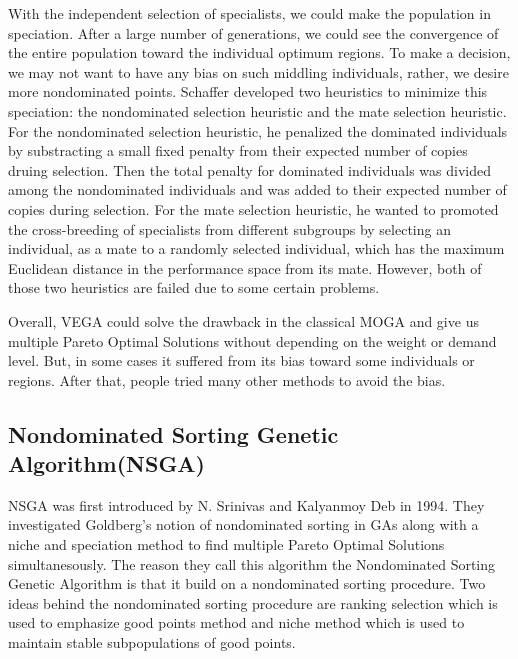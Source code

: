 With the independent selection of specialists, we could make the population in speciation. After a large number of generations, we could see the convergence of the entire population toward the individual optimum regions. To make a decision, we may not want to have any bias on such middling individuals, rather, we desire more nondominated points. Schaffer developed two heuristics to minimize this speciation: the nondominated selection heuristic and the mate selection heuristic. For the nondominated selection heuristic, he penalized the dominated individuals by substracting a small fixed penalty from their expected number of copies druing selection. Then the total penalty for dominated individuals was divided among the nondominated individuals and was added to their expected number of copies during selection. For the mate selection heuristic, he wanted to promoted the cross-breeding of specialists from different subgroups by selecting an individual, as a mate to a randomly selected individual, which has the maximum Euclidean distance in the performance space from its mate. However, both of those two heuristics are failed due to some certain problems.

Overall, VEGA could solve the drawback in the classical MOGA and give us multiple Pareto Optimal Solutions without depending on the weight or demand level. But, in some cases it suffered from its bias toward some individuals or regions. After that, people tried many other methods to avoid the bias.

\subsection{Nondominated Sorting Genetic Algorithm(NSGA)}
NSGA was first introduced by N. Srinivas and Kalyanmoy Deb in 1994\cite{NSGA_1994}. They investigated Goldberg's notion of nondominated sorting in GAs along with a niche and speciation method to find multiple Pareto Optimal Solutions simultanesously. The reason they call this algorithm the Nondominated Sorting Genetic Algorithm is that it build on a nondominated sorting procedure. Two ideas behind the nondominated sorting procedure are ranking selection which is used to emphasize good points method and niche method which is used to maintain stable subpopulations of good points.

